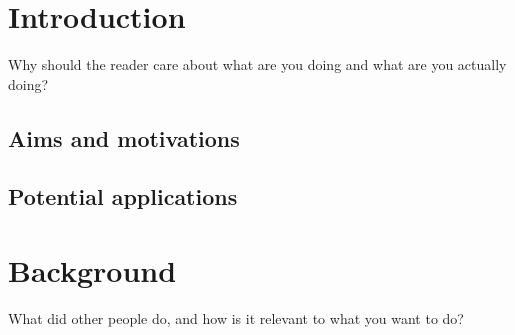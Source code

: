 \documentclass{l4proj}
\begin{document}
%
%
%
%
%
%
%
\chapter{Introduction}



Why should the reader care about what are you doing and what are you actually doing?

\section{Aims and motivations}

\section{Potential applications}


\chapter{Background}
What did other people do, and how is it relevant to what you want to do?
\end{document}
